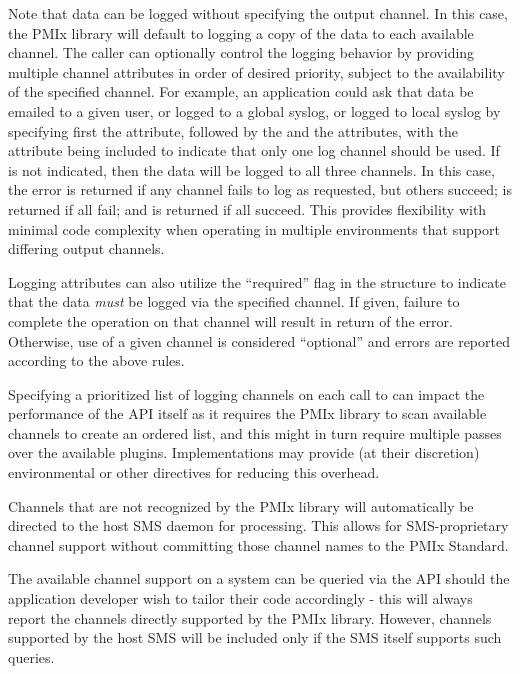 \par
Note that data can be logged without specifying the output channel. In this case, the PMIx library will default to logging a copy of the data to each available channel. The caller can optionally control the logging behavior by providing multiple channel attributes in order of desired priority, subject to the availability of the specified channel. For example, an application could ask that data be emailed to a given user, or logged to a global syslog, or logged to local syslog by specifying first the  attribute, followed by the  and the  attributes, with the  attribute being included to indicate that only one log channel should be used. If  is not indicated, then the data will be logged to all three channels. In this case, the  error is returned if any channel fails to log as requested, but others succeed;  is returned if all fail; and  is returned if all succeed. This provides flexibility with minimal code complexity when operating in multiple environments that support differing output channels.

\par
Logging attributes can also utilize the ``required'' flag in the  structure to indicate that the data \emph{must} be logged via the specified channel. If given, failure to complete the operation on that channel will result in return of the  error. Otherwise, use of a given channel is considered ``optional'' and errors are reported according to the above rules.

Specifying a prioritized list of logging channels on each call to  can impact the performance of the \ac{API} itself as it requires the \ac{PMIx} library to scan available channels to create an ordered list, and this might in turn require multiple passes over the available plugins. Implementations may provide (at their discretion) environmental or other directives for reducing this overhead.

Channels that are not recognized by the \ac{PMIx} library will automatically be directed to the host \ac{SMS} daemon for processing. This allows for \ac{SMS}-proprietary channel support without committing those channel names to the \ac{PMIx} Standard.

\adviceuserstart
The available channel support on a system can be queried via the  \ac{API} should the application developer wish to tailor their code accordingly - this will always report the channels directly supported by the \ac{PMIx} library. However, channels supported by the host \ac{SMS} will be included only if the \ac{SMS} itself supports such queries.
\adviceuserend


